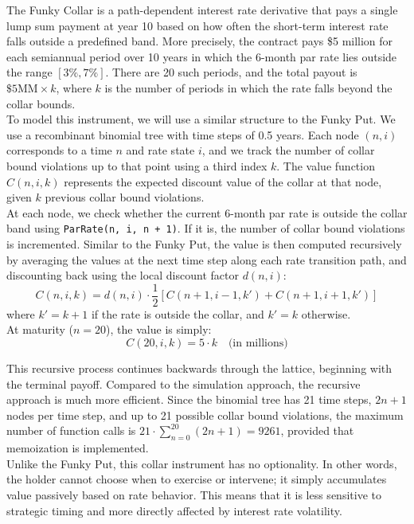 \documentclass{report}
\begin{document}
The Funky Collar is a path-dependent interest rate derivative that pays a single lump sum payment at year 10 based on how often the short-term interest rate falls outside a predefined band. More precisely, the contract pays \$5 million for each semiannual period over 10 years in which the 6-month par rate lies outside the range $[3\%, 7\%]$. There are 20 such periods, and the total payout is $\$5\text{MM} \times k$, where $k$ is the number of periods in which the rate falls beyond the collar bounds.\\

To model this instrument, we will use a similar structure to the Funky Put. We use a recombinant binomial tree with time steps of 0.5 years. Each node $(n, i)$ corresponds to a time $n$ and rate state $i$, and we track the number of collar bound violations up to that point using a third index $k$. The value function $C(n, i, k)$ represents the expected discount value of the collar at that node, given $k$ previous collar bound violations. \\

At each node, we check whether the current 6-month par rate is outside the collar band using \texttt{ParRate(n, i, n + 1)}. If it is, the number of collar bound violations is incremented. Similar to the Funky Put, the value is then computed recursively by averaging the values at the next time step along each rate transition path, and discounting back using the local discount factor $d(n, i)$:
\[
C(n, i, k) = d(n, i) \cdot \frac{1}{2} \left[ C(n+1, i-1, k') + C(n+1, i+1, k') \right]
\]
where $k' = k + 1$ if the rate is outside the collar, and $k' = k$ otherwise. \\

At maturity ($n = 20$), the value is simply:
\[
C(20, i, k)= 5 \cdot k \quad \text{(in millions)}
\]

This recursive process continues backwards through the lattice, beginning with the terminal payoff. Compared to the simulation approach, the recursive approach is much more efficient. Since the binomial tree has 21 time steps, $2n + 1$ nodes per time step, and up to 21 possible collar bound violations, the maximum number of function calls is $21 \cdot \sum_{n=0}^{20} (2n+1)=9261$, provided that memoization is implemented. \\

Unlike the Funky Put, this collar instrument has no optionality. In other words, the holder cannot choose when to exercise or intervene; it simply accumulates value passively based on rate behavior. This means that it is less sensitive to strategic timing and more directly affected by interest rate volatility. \\
\end{document}
